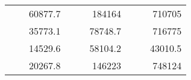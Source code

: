 \begin{table}[H]
\begin{tabular}{|ccrccrccc}
\rowcolor[HTML]{DDFDFF} 
\multicolumn{1}{|c|}{\cellcolor[HTML]{FFFFC7}}                                & \multicolumn{1}{c|}{\cellcolor[HTML]{DDFDFF}}                      & \multicolumn{1}{r|}{\cellcolor[HTML]{DAE8FC}60877.7}   & \multicolumn{1}{c|}{\cellcolor[HTML]{FFFFC7}}                                & \multicolumn{1}{c|}{\cellcolor[HTML]{DDFDFF}}                       & \multicolumn{1}{r|}{\cellcolor[HTML]{DDFDFF}184164}    & \multicolumn{1}{c|}{\cellcolor[HTML]{FFFFC7}}                                & \multicolumn{1}{c|}{\cellcolor[HTML]{DDFDFF}}                      & \multicolumn{1}{r|}{\cellcolor[HTML]{DDFDFF}710705}    \\ \cline{3-3} \cline{6-6} \cline{9-9} 
\multicolumn{1}{|c|}{\cellcolor[HTML]{FFFFC7}}                                & \multicolumn{1}{c|}{\cellcolor[HTML]{DDFDFF}}                      & \multicolumn{1}{r|}{\cellcolor[HTML]{DDFDFF}35773.1}   & \multicolumn{1}{c|}{\cellcolor[HTML]{FFFFC7}}                                & \multicolumn{1}{c|}{\cellcolor[HTML]{DDFDFF}}                       & \multicolumn{1}{r|}{\cellcolor[HTML]{DAE8FC}78748.7}   & \multicolumn{1}{c|}{\cellcolor[HTML]{FFFFC7}}                                & \multicolumn{1}{c|}{\cellcolor[HTML]{DDFDFF}}                      & \multicolumn{1}{r|}{\cellcolor[HTML]{DAE8FC}716775}    \\ \cline{3-3} \cline{6-6} \cline{9-9} 
\rowcolor[HTML]{DDFDFF} 
\multicolumn{1}{|c|}{\cellcolor[HTML]{FFFFC7}}                                & \multicolumn{1}{c|}{\cellcolor[HTML]{DDFDFF}}                      & \multicolumn{1}{r|}{\cellcolor[HTML]{DAE8FC}14529.6}   & \multicolumn{1}{c|}{\cellcolor[HTML]{FFFFC7}}                                & \multicolumn{1}{c|}{\cellcolor[HTML]{DDFDFF}}                       & \multicolumn{1}{r|}{\cellcolor[HTML]{DDFDFF}58104.2}   & \multicolumn{1}{c|}{\cellcolor[HTML]{FFFFC7}}                                & \multicolumn{1}{c|}{\cellcolor[HTML]{DDFDFF}}                      & \multicolumn{1}{r|}{\cellcolor[HTML]{DDFDFF}43010.5}   \\ \cline{3-3} \cline{6-6} \cline{9-9} 
\multicolumn{1}{|c|}{\cellcolor[HTML]{FFFFC7}}                                & \multicolumn{1}{c|}{\cellcolor[HTML]{DDFDFF}}                      & \multicolumn{1}{r|}{\cellcolor[HTML]{DDFDFF}20267.8}   & \multicolumn{1}{c|}{\cellcolor[HTML]{FFFFC7}}                                & \multicolumn{1}{c|}{\cellcolor[HTML]{DDFDFF}}                       & \multicolumn{1}{r|}{\cellcolor[HTML]{DAE8FC}146223}    & \multicolumn{1}{c|}{\cellcolor[HTML]{FFFFC7}}                                & \multicolumn{1}{c|}{\cellcolor[HTML]{DDFDFF}}                      & \multicolumn{1}{r|}{\cellcolor[HTML]{DAE8FC}748124}    \\ \cline{3-3} \cline{6-6} \cline{9-9} 

\end{tabular}
\end{table}
